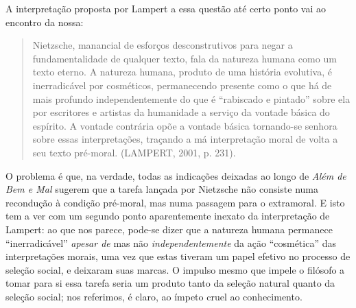 \documentclass[
	12pt,				%
	openright,			%
	oneside,			%
	a4paper,			%
	english,			%
	french,				%
	spanish,			%
	brazil				%
	]{abntex2}
\begin{document}
	A interpretação proposta por Lampert a essa questão até certo ponto vai ao encontro da nossa:

\begin{quotation}
Nietzsche, manancial de esforços desconstrutivos para negar a fundamentalidade de qualquer texto, fala da natureza humana como um texto eterno. A natureza humana, produto de uma história evolutiva, é inerradicável por cosméticos, permanecendo presente como o que há de mais profundo independentemente do que é “rabiscado e pintado” sobre ela por escritores e artistas da humanidade a serviço da vontade básica do espírito. A vontade contrária opõe a vontade básica tornando-se senhora sobre essas interpretações, traçando a má interpretação moral de volta a seu texto pré-moral. (LAMPERT, 2001, p. 231).
\end{quotation}

O problema é que, na verdade, todas as indicações deixadas ao longo de \textit{Além de Bem e Mal} sugerem que a tarefa lançada por Nietzsche não consiste numa recondução à condição pré-moral, mas numa passagem para o extramoral. E isto tem a ver com um segundo ponto aparentemente inexato da interpretação de Lampert: ao que nos parece, pode-se dizer que a natureza humana permanece “inerradicável” \textit{apesar de} mas não \textit{independentemente} da ação “cosmética” das interpretações morais, uma vez que estas tiveram um papel efetivo no processo de seleção social, e deixaram suas marcas. O impulso mesmo que impele o filósofo a tomar para si essa tarefa seria um produto tanto da seleção natural quanto da seleção social; nos referimos, é claro, ao ímpeto cruel ao conhecimento.
\end{document}
